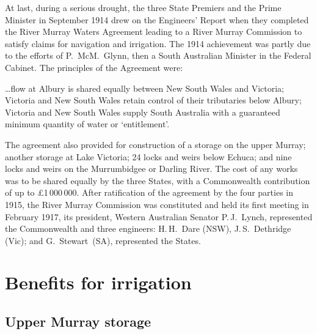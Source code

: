 At last, during a serious drought, the three State
Premiers and the Prime Minister in September 1914 drew on the
Engineers' Report when they completed the River Murray Waters
Agreement leading to a River Murray Commission  to satisfy claims for navigation and irrigation. The 1914
achievement was partly due to the efforts of P.~McM.~Glynn,
 then a South Australian Minister in the
Federal Cabinet. The principles
of the Agreement were:
\begin{Quote}
	\ldots flow at Albury  is shared equally
	between New South Wales and Victoria; Victoria and New South
	Wales retain control of their tributaries below Albury;
	Victoria and New South Wales supply South Australia with a
	guaranteed minimum quantity of water or
	`entitlement'.
\end{Quote}

The agreement also provided for construction of a storage on the upper
Murray; another storage at Lake Victoria;  24
locks and weirs below Echuca;  and nine locks and
weirs on the Murrumbidgee or Darling River. 
 The cost of any works was to be shared
equally by the three States, with a Commonwealth contribution of up to
\pounds1\,000\,000. After ratification of the agreement by the four
parties in 1915, the River Murray Commission was constituted and held
its first meeting in February 1917, its president, Western Australian
Senator P.\,J.~Lynch,
  represented the Commonwealth and three
engineers: H.\,H.~Dare (NSW),   J.\,S.~Dethridge
(Vic);  and G.~Stewart~(SA),   represented the States.

\section*{Benefits for irrigation}

\subsection*{Upper Murray storage}

